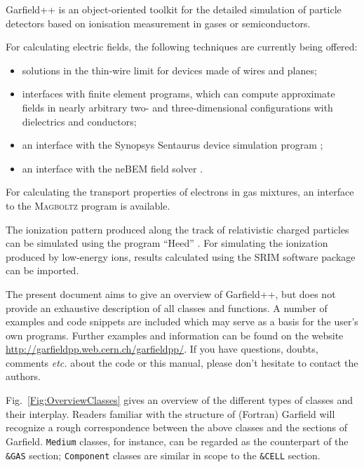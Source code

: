 Garfield++ is an object-oriented toolkit for the detailed simulation of 
particle detectors based on ionisation measurement in 
gases or semiconductors.

For calculating electric fields, the following techniques are currently
being offered:
\begin{itemize}
  \item
  solutions in the thin-wire limit for devices made of wires and planes;
  \item
  interfaces with finite element programs, 
  which can compute approximate fields in nearly arbitrary 
  two- and three-dimensional configurations 
  with dielectrics and conductors;
  \item
  an interface with the Synopsys Sentaurus device simulation program
  \cite{Synopsys};
  \item
  an interface with the neBEM field solver 
  \cite{Mukhopadhyay2007,Mukhopadhyay2006}.
\end{itemize}

For calculating the transport properties of electrons in gas 
mixtures, an interface to the \textsc{Magboltz} program 
\cite{BiagiMagboltz,Biagi1999} is available. 

The ionization pattern produced along the 
track of relativistic charged particles can be simulated using 
the program ``Heed'' \cite{Smirnov2005}.
For simulating the ionization produced by low-energy ions, 
results calculated using the SRIM software package \cite{Ziegler1985} 
can be imported.

The present document aims to give an overview of Garfield++, 
but does not provide an exhaustive 
description of all classes and functions.
A number of examples and code snippets are included 
which may serve as a basis for the user's own programs. 
Further examples and information can be found on the website 
\url{http://garfieldpp.web.cern.ch/garfieldpp/}.
If you have questions, doubts, comments \textit{etc.} about the code 
or this manual, please don't hesitate to contact the authors.
 

Fig.~\ref{Fig:OverviewClasses} gives an overview of the different types 
of classes and their interplay. 
Readers familiar with the structure 
of (Fortran) Garfield \cite{GarfieldFortran} will recognize a 
rough correspondence between 
the above classes and the sections of Garfield. 
\texttt{Medium} classes, for instance, can be regarded as the counterpart 
of the \texttt{\&GAS} section; 
\texttt{Component} classes are similar in 
scope to the \texttt{\&CELL} section.  
 
